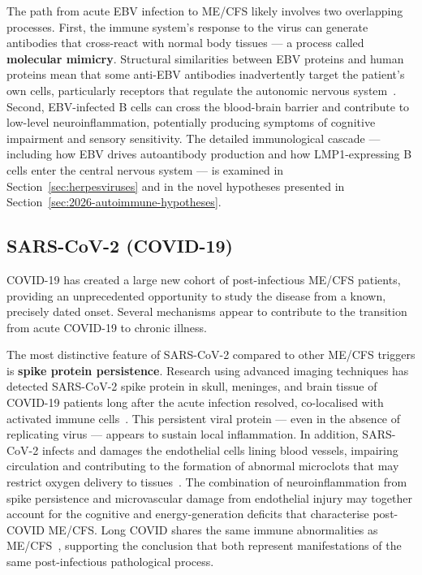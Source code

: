 The path from acute EBV infection to ME/CFS likely involves two overlapping processes. First, the immune system's response to the virus can generate antibodies that cross-react with normal body tissues --- a process called \textbf{molecular mimicry}. Structural similarities between EBV proteins and human proteins mean that some anti-EBV antibodies inadvertently target the patient's own cells, particularly receptors that regulate the autonomic nervous system~\cite{Pless2026ebv_demyelination}. Second, EBV-infected B cells can cross the blood-brain barrier and contribute to low-level neuroinflammation, potentially producing symptoms of cognitive impairment and sensory sensitivity. The detailed immunological cascade --- including how EBV drives autoantibody production and how LMP1-expressing B cells enter the central nervous system --- is examined in Section~\ref{sec:herpesviruses} and in the novel hypotheses presented in Section~\ref{sec:2026-autoimmune-hypotheses}.

\subsection{SARS-CoV-2 (COVID-19)}

COVID-19 has created a large new cohort of post-infectious ME/CFS patients, providing an unprecedented opportunity to study the disease from a known, precisely dated onset. Several mechanisms appear to contribute to the transition from acute COVID-19 to chronic illness.

The most distinctive feature of SARS-CoV-2 compared to other ME/CFS triggers is \textbf{spike protein persistence}. Research using advanced imaging techniques has detected SARS-CoV-2 spike protein in skull, meninges, and brain tissue of COVID-19 patients long after the acute infection resolved, co-localised with activated immune cells~\cite{Rong2024spike}. This persistent viral protein --- even in the absence of replicating virus --- appears to sustain local inflammation. In addition, SARS-CoV-2 infects and damages the endothelial cells lining blood vessels, impairing circulation and contributing to the formation of abnormal microclots that may restrict oxygen delivery to tissues~\cite{Nunes2022microclots}. The combination of neuroinflammation from spike persistence and microvascular damage from endothelial injury may together account for the cognitive and energy-generation deficits that characterise post-COVID ME/CFS. Long COVID shares the same immune abnormalities as ME/CFS~\cite{PNAS2025MECFSLongCOVID}, supporting the conclusion that both represent manifestations of the same post-infectious pathological process.

